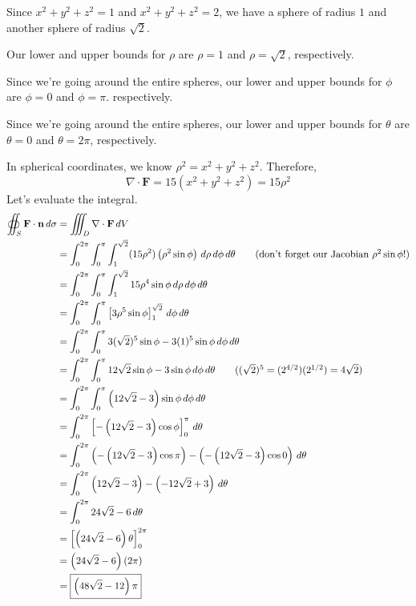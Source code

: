 \documentclass{article}
\newcommand{\lrp}[1]{\left( #1 \right)}
\newcommand{\lrb}[1]{\left[ #1 \right]}
\newcommand{\F}[0]{\mathbf{F}}
\newcommand{\n}[0]{{\mathbf{n}}}
\begin{document}
Since $x^2+y^2+z^2=1$ and $x^2+y^2+z^2=2$, we have a sphere of radius $1$ and another sphere of radius $\sqrt{2}$.

Our lower and upper bounds for $\rho$ are $\rho = 1$ and $\rho = \sqrt{2}$, respectively.

Since we're going around the entire spheres, our lower and upper bounds for $\phi$ are $\phi=0$ and $\phi=\pi$. respectively.

Since we're going around the entire spheres, our lower and upper bounds for $\theta$ are $\theta=0$ and $\theta=2\pi$, respectively.


In spherical coordinates, we know $\rho^2 = x^2+y^2+z^2$. Therefore,
\begin{equation*}
    \nabla \cdot \F = 15(x^2+y^2+z^2)=15\rho^2
\end{equation*}
Let's evaluate the integral.
\begin{align*}
   \oiint_S \F\cdot \n\,d\sigma &=\iiint_D\nabla \cdot \F\,dV\\
   &=\int_0^{2\pi}\int_0^{\pi}\int_1^{\sqrt{2}} (15\rho^2)\lrp{\rho^2\sin\phi}\,d\rho\,d\phi\,d\theta\tag{don't forget our Jacobian $\rho^2\sin\phi$!}\\
    &=\int_0^{2\pi}\int_0^{\pi}\int_1^{\sqrt{2}} 15\rho^4\sin\phi\,d\rho\,d\phi\,d\theta\\
    &=\int_0^{2\pi}\int_0^\pi\lrb{3\rho^5\sin\phi}_1^{\sqrt{2}}\,d\phi\,d\theta\\
    &=\int_0^{2\pi}\int_0^\pi 3(\sqrt{2})^5\sin\phi - 3(1)^5\sin\phi\,d\phi\,d\theta\\
    &=\int_0^{2\pi}\int_0^{\pi} 12\sqrt{2}\sin\phi-3\sin\phi\,d\phi\,d\theta\tag{$(\sqrt{2})^5=(2^{4/2})(2^{1/2})=4\sqrt{2}$}\\
    &=\int_0^{2\pi}\int_0^{\pi}\lrp{12\sqrt{2}-3}\sin\phi\,d\phi\,d\theta\\
    &=\int_0^{2\pi}\lrb{-\lrp{12\sqrt{2}-3}\cos \phi}_0^{\pi}\,d\theta\\
    &=\int_0^{2\pi}\lrp{-\lrp{12\sqrt{2}-3}\cos\pi}-\lrp{-\lrp{12\sqrt{2}-3}\cos 0}\,d\theta\\
    &=\int_0^{2\pi}\lrp{12\sqrt{2}-3}-\lrp{-12\sqrt{2}+3}\,d\theta\\
    &=\int_0^{2\pi} 24\sqrt{2} - 6\,d\theta\\
    &=\lrb{\lrp{24\sqrt{2}-6}\theta}_0^{2\pi}\\
    &=\lrp{24\sqrt{2}-6}\lrp{2\pi}\\
    &=\boxed{\lrp{48\sqrt{2}-12}\pi}
\end{align*}
\end{document}
